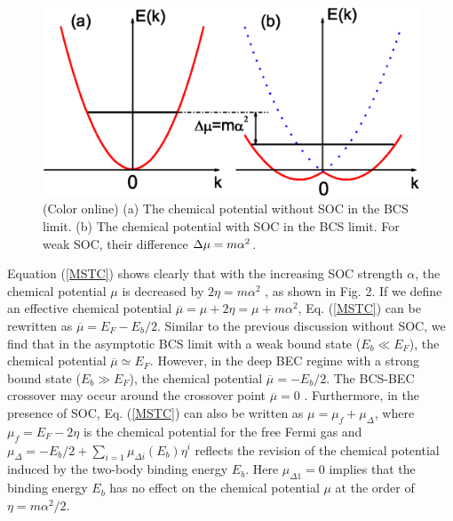 \documentclass[pra,print,showpacs,superscriptaddress,twocolumn]{revtex4}
\begin{document}
\begin{figure}[bp]
\includegraphics[width = 1\linewidth]{FIG2.eps}
\caption{(Color online) (a) The chemical potential without SOC in the BCS
limit. (b) The chemical potential with SOC in the BCS limit. For weak SOC,
their difference $\Delta \protect\mu =m\protect\alpha ^{2}$.}
\label{fig2}
\end{figure}
Equation (\ref{MSTC}) shows clearly that with the increasing SOC strength $%
\alpha $, the chemical potential $\mu $ is decreased by $2\eta =m\alpha ^{2}$%
, as shown in Fig. 2. If we define an effective chemical potential $%
\overline{\mu }=\mu +2\eta =\mu +m\alpha ^{2}$, Eq. (\ref{MSTC}) can be
rewritten as $\overline{\mu }=E_{F}-E_{b}/2$. Similar to the previous
discussion without SOC, we find that in the asymptotic BCS limit with a weak
bound state ($E_{b}\ll E_{F}$), the chemical potential $\overline{\mu }%
\simeq E_{F}$. However, in the deep BEC regime with a strong bound state ($%
E_{b}\gg E_{F}$), the chemical potential $\overline{\mu }=-E_{b}/2$. The
BCS-BEC crossover may occur around the crossover point $\overline{\mu }=0$
\cite{MR}. Furthermore, in the presence of SOC, Eq. (\ref{MSTC}) can also be
written as $\mu =\mu _{f}+\mu _{\Delta }$, where $\mu _{f}=E_{F}-2\eta $ is
the chemical potential for the free Fermi gas and $\mu _{\Delta
}=-E_{b}/2+\sum_{i=1}\mu _{\Delta i}(E_{b})\eta ^{i}$ reflects the revision
of the chemical potential induced by the two-body binding energy $E_{b}$.
Here $\mu _{\Delta 1}=0$ implies that the binding energy $E_{b}$ has no
effect on the chemical potential $\mu $ at the order of $\eta =m\alpha
^{2}/2 $.
\end{document}
